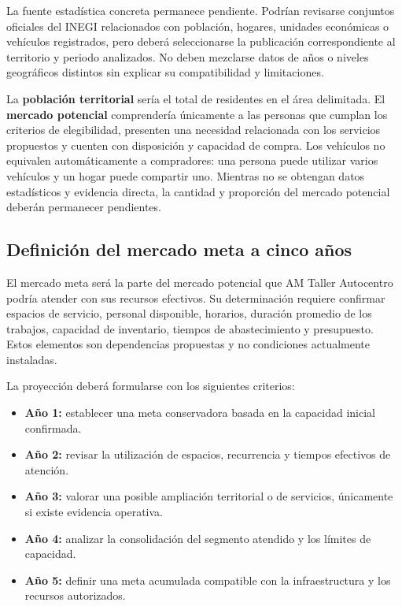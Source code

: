 \documentclass[12pt,letterpaper,oneside]{article}
\begin{document}
La fuente estadística concreta permanece pendiente. Podrían revisarse conjuntos oficiales del INEGI relacionados con población, hogares, unidades económicas o vehículos registrados, pero deberá seleccionarse la publicación correspondiente al territorio y periodo analizados. No deben mezclarse datos de años o niveles geográficos distintos sin explicar su compatibilidad y limitaciones.

La \textbf{población territorial} sería el total de residentes en el área delimitada. El \textbf{mercado potencial} comprendería únicamente a las personas que cumplan los criterios de elegibilidad, presenten una necesidad relacionada con los servicios propuestos y cuenten con disposición y capacidad de compra. Los vehículos no equivalen automáticamente a compradores: una persona puede utilizar varios vehículos y un hogar puede compartir uno. Mientras no se obtengan datos estadísticos y evidencia directa, la cantidad y proporción del mercado potencial deberán permanecer pendientes.

\subsection{Definición del mercado meta a cinco años}

El mercado meta será la parte del mercado potencial que AM Taller Autocentro podría atender con sus recursos efectivos. Su determinación requiere confirmar espacios de servicio, personal disponible, horarios, duración promedio de los trabajos, capacidad de inventario, tiempos de abastecimiento y presupuesto. Estos elementos son dependencias propuestas y no condiciones actualmente instaladas.

La proyección deberá formularse con los siguientes criterios:

\begin{itemize}
    \item \textbf{Año 1:} establecer una meta conservadora basada en la capacidad inicial confirmada.
    \item \textbf{Año 2:} revisar la utilización de espacios, recurrencia y tiempos efectivos de atención.
    \item \textbf{Año 3:} valorar una posible ampliación territorial o de servicios, únicamente si existe evidencia operativa.
    \item \textbf{Año 4:} analizar la consolidación del segmento atendido y los límites de capacidad.
    \item \textbf{Año 5:} definir una meta acumulada compatible con la infraestructura y los recursos autorizados.
\end{itemize}
\end{document}
